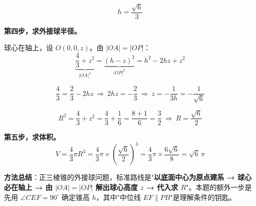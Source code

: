 \begin{answer}
\nopagebreak[4]
\[h=\frac{\sqrt6}3\]

\textbf{第四步，求外接球半径。}

球心在轴上，设 $O(0,0,z)$。由 $|OA|=|OP|$：
\nopagebreak[4]
\[\underbrace{\frac43+z^{2}}_{|OA|^{2}}=\underbrace{(h-z)^{2}}_{|OP|^{2}}=h^{2}-2hz+z^{2}\]

\nopagebreak[4]
\[\frac43=\frac23-2hz\ \Longrightarrow\ 2hz=-\frac23\ \Longrightarrow\ z=-\frac1{3h}=-\frac1{\sqrt6}\]

\nopagebreak[4]
\[R^{2}=\frac43+z^{2}=\frac43+\frac16=\frac{8+1}6=\frac32\ \Longrightarrow\ R=\frac{\sqrt6}2\]

\textbf{第五步，求体积。}
\nopagebreak[4]
\[V=\frac43\pi R^{3}=\frac43\pi\times\left(\frac{\sqrt6}2\right)^{3}=\frac43\pi\times\frac{6\sqrt6}8=\sqrt6\,\pi\]

\begin{gktip}
\textbf{方法总结}：正三棱锥的外接球问题，标准路线是"\textbf{以底面中心为原点建系 → 球心必在轴上 → 由 $|OA|=|OP|$ 解出球心高度 $z$ → 代入求 $R$}"。本题的额外一步是先用 $\angle CEF=90^\circ$ 确定锥高 $h$，其中"中位线 $EF\parallel PB$"是理解条件的钥匙。
\end{gktip}


\par\medskip

\end{answer}

